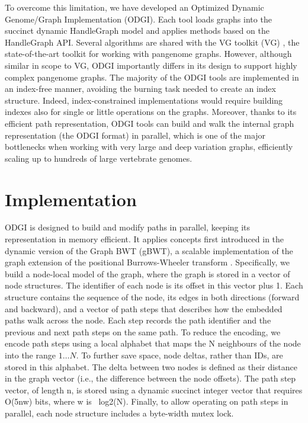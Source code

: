 \documentclass{bioinfo}
\begin{document}
To overcome this limitation, we have developed an Optimized Dynamic Genome/Graph Implementation (ODGI). Each tool loads graphs into the succinct dynamic HandleGraph model \citep{Eizenga_2020_BX} and applies methods based on the HandleGraph API. Several algorithms are shared with the VG toolkit (VG) \citep{Garrison:2018}, the state-of-the-art toolkit for working with pangenome graphs. However, although similar in scope to VG, ODGI importantly differs in its design to support highly complex pangenome graphs. The majority of the ODGI tools are implemented in an index-free manner, avoiding the burning task needed to create an index structure. Indeed, index-constrained implementations would require building indexes also for single or little operations on the graphs. Moreover, thanks to its efficient path representation, ODGI tools can build and walk the internal graph representation (the ODGI format) in parallel, which is one of the major bottlenecks when working with very large and deep variation graphs, efficiently scaling up to hundreds of large vertebrate genomes.


\section{Implementation}

ODGI is designed to build and modify paths in parallel, keeping its representation in memory efficient.
It applies concepts first introduced in the dynamic version of the Graph BWT \citep{Siren:2020} (gBWT), a scalable implementation of the graph extension of the positional Burrows-Wheeler transform \citep{Durbin_2014}.
Specifically, we build a node-local model of the graph, where the graph is stored in a vector of node structures.
The identifier of each node is its offset in this vector plus 1.
Each structure contains the sequence of the node, its edges in both directions (forward and backward), and a vector of path steps that describes how the embedded paths walk across the node.
Each step records the path identifier and the previous and next path steps on the same path.
To reduce the encoding, we encode path steps using a local alphabet that maps the N neighbours of the node into the range $1\ldots N$.
To further save space, node deltas, rather than IDs, are stored in this alphabet.
The delta between two nodes is defined as their distance in the graph vector (i.e., the difference between the node offsets).
The path step vector, of length n, is stored using a dynamic succinct integer vector that requires O(5nw) bits, where w is ~log2(N).
Finally, to allow operating on path steps in parallel, each node structure includes a byte-width mutex lock.
\end{document}
